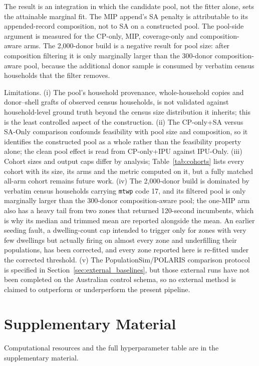 \documentclass[review]{elsarticle}
\begin{document}
The result is an integration in which the candidate pool, not the fitter alone,
sets the attainable marginal fit. The MIP append's SA penalty is attributable
to its appended-record composition, not to SA on a constructed pool. The
pool-side argument is measured for the CP-only, MIP, coverage-only and
composition-aware arms. The 2,000-donor build is a negative result for pool
size: after composition filtering it is only marginally larger than the
300-donor composition-aware pool, because the additional donor sample is
consumed by verbatim census households that the filter removes.

Limitations. (i) The pool's household provenance, whole-household copies and
donor--shell grafts of observed census households, is not validated against
household-level ground truth beyond the census size distribution it inherits;
this is the least controlled aspect of the construction. (ii) The CP-only+SA
versus SA-Only comparison confounds feasibility with pool size and composition,
so it identifies the constructed pool as a whole rather than the feasibility
property alone; the clean pool effect is read from CP-only+IPU against
IPU-Only. (iii) Cohort sizes and output caps differ by analysis;
Table~\ref{tab:cohorts} lists every cohort with its size, its arms and the
metric computed on it, but a fully matched all-arm cohort remains future work.
(iv) The 2,000-donor build is dominated by verbatim census households carrying
\texttt{mtwp} code 17, and its filtered pool is only marginally larger than the
300-donor composition-aware pool; the one-MIP arm also has a heavy tail from two
zones that returned 120-second incumbents, which is why its median and trimmed
mean are reported alongside the mean. An earlier seeding fault, a dwelling-count
cap intended to trigger only for zones with very few dwellings but actually
firing on almost every zone and underfilling their populations, has been
corrected, and every zone reported here is re-fitted under the corrected
threshold. (v) The PopulationSim/POLARIS comparison protocol is specified in
Section~\ref{sec:external_baselines}, but those external runs have not been
completed on the Australian control schema, so no external method is claimed to
outperform or underperform the present pipeline.

\section*{Supplementary Material}
Computational resources and the full hyperparameter table are in the supplementary material.
\end{document}

